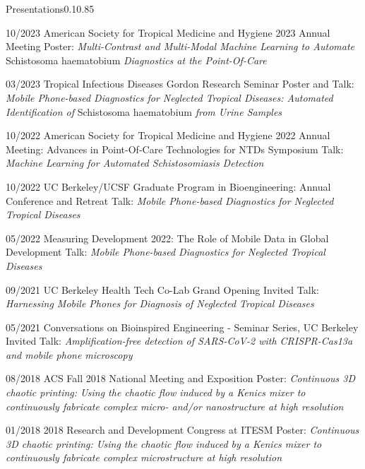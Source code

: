 \documentclass{federico_cv}
\begin{document}
\begin{tblSection}{Presentations}{0.1}{0.85}

\leftbfrightsingle
{10/2023}
{American Society for Tropical Medicine and Hygiene 2023 Annual Meeting}
{Poster: \textit{Multi-Contrast and Multi-Modal Machine Learning to Automate} Schistosoma haematobium \textit{Diagnostics at the Point-Of-Care}}

\leftbfrightsingle
{03/2023}
{Tropical Infectious Diseases Gordon Research Seminar}
{Poster and Talk: \textit{Mobile Phone-based Diagnostics for Neglected Tropical Diseases: Automated Identification of} Schistosoma haematobium \textit{from Urine Samples}}

\leftbfrightsingle
{10/2022}
{American Society for Tropical Medicine and Hygiene 2022 Annual Meeting: Advances in Point-Of-Care Technologies for NTDs Symposium}
{Talk: \textit{Machine Learning for Automated Schistosomiasis Detection}}

\leftbfrightsingle
{10/2022}
{UC Berkeley/UCSF Graduate Program in Bioengineering: Annual Conference and Retreat}
{Talk: \textit{Mobile Phone-based Diagnostics for Neglected Tropical Diseases}}

\leftbfrightsingle
{05/2022}
{Measuring Development 2022: The Role of Mobile Data in Global Development}
{Talk: \textit{Mobile Phone-based Diagnostics for Neglected Tropical Diseases}}

\leftbfrightsingle
{09/2021}
{UC Berkeley Health Tech Co-Lab Grand Opening}
{Invited Talk: \textit{Harnessing Mobile Phones for Diagnosis of Neglected Tropical Diseases}}

\leftbfrightsingle
{05/2021}
{Conversations on Bioinspired Engineering - Seminar Series, UC Berkeley}
{Invited Talk: \textit{Amplification-free detection of SARS-CoV-2 with CRISPR-Cas13a and mobile phone microscopy}}

\leftbfrightsinglenobreak
{08/2018}
{ACS Fall 2018 National Meeting and Exposition}
{Poster: \textit{Continuous 3D chaotic printing: Using the chaotic flow induced by a Kenics mixer to continuously fabricate complex micro- and/or nanostructure at high resolution}}

\leftbfrightsingle
{01/2018}
{2018 Research and Development Congress at ITESM}
{Poster: \textit{Continuous 3D chaotic printing: Using the chaotic flow induced by a Kenics mixer to continuously fabricate complex microstructure at high resolution}}

\end{tblSection}
\end{document}
